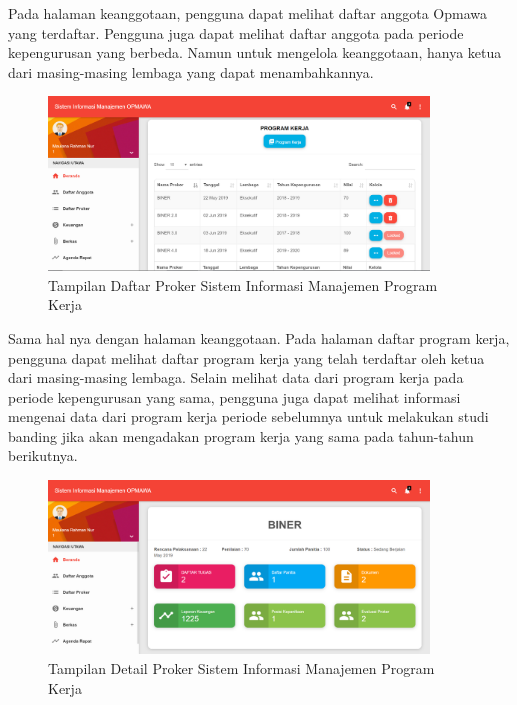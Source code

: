 Pada halaman keanggotaan, pengguna dapat melihat daftar anggota Opmawa yang terdaftar. Pengguna juga dapat melihat daftar anggota pada periode kepengurusan yang berbeda. Namun untuk mengelola keanggotaan, hanya ketua dari masing-masing lembaga yang dapat menambahkannya.

\begin{figure}[H]
	\centering
	\includegraphics[width=0.9\textwidth]{gambar/interface_proker}
	\caption{ Tampilan Daftar Proker Sistem Informasi Manajemen Program Kerja}
	\label{Tampilan_Proker}
\end{figure}

Sama hal nya dengan halaman keanggotaan. Pada halaman daftar program kerja, pengguna dapat melihat daftar program kerja yang telah terdaftar oleh ketua dari masing-masing lembaga. Selain melihat data dari program kerja pada periode kepengurusan yang sama, pengguna juga dapat melihat informasi mengenai data dari program kerja periode sebelumnya untuk melakukan studi banding jika akan mengadakan program kerja yang sama pada tahun-tahun berikutnya.

\begin{figure}[H]
	\centering
	\includegraphics[width=0.9\textwidth]{gambar/interface_detail}
	\caption{ Tampilan Detail Proker Sistem Informasi Manajemen Program Kerja}
	\label{Tampilan_Detail}
\end{figure}

